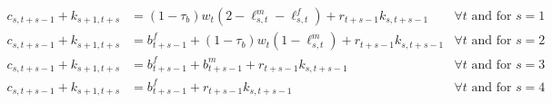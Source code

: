 
 	 \begin{align}
 	c_{s,t+s-1} + k_{s+1,t+s} &= (1-\tau_b)w_t (2-\ell_{s,t}^m - \ell_{s,t}^f) + r_{t+s-1}k_{s,t+s-1} & \forall t\text{ and for $s=1$} \\
 	c_{s,t+s-1} + k_{s+1,t+s} &= b_{t+s-1}^f+(1-\tau_b)w_t (1-\ell_{s,t}^m ) + r_{t+s-1}k_{s,t+s-1} & \forall t\text{ and for $s=2$} \\
 	c_{s,t+s-1} + k_{s+1,t+s} &= b_{t+s-1}^f+ b_{t+s-1}^m  + r_{t+s-1}k_{s,t+s-1} & \forall t\text{ and for $s=3$} \\
 	c_{s,t+s-1} + k_{s+1,t+s} &= b_{t+s-1}^f + r_{t+s-1}k_{s,t+s-1} & \forall t\text{ and for $s=4$}
 \end{align}
